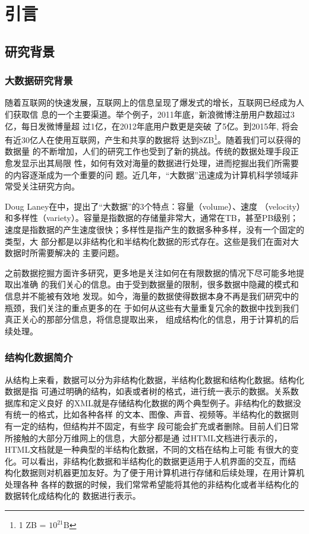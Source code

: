 \chapter{引言}
\label{chap:intro}

\section{研究背景}
\label{sec:background}
\subsection{大数据研究背景}
随着互联网的快速发展，互联网上的信息呈现了爆发式的增长，互联网已经成为人们获取信
息的一个主要渠道。举个例子，2011年底，新浪微博注册用户数超过3亿，每日发微博量超
过1亿\cite{weibo-info1}，在2012年底用户数更是突破
了5亿\cite{weibo-info2}。到2015年, 将会有近30亿人在使用互联网，产生和共享的数据将
达到8ZB\footnote{1 ZB = $10^{21}$B}\cite{bigdata-info}。随着我们可以获得的数据量
的不断增加，人们的研究工作也受到了新的挑战。传统的数据处理手段正愈发显示出其局限
性，如何有效对海量的数据进行处理，进而挖掘出我们所需要的内容逐渐成为一个重要的问
题。近几年，“大数据”迅速成为计算机科学领域非常受关注研究方向。

Doug Laney在\cite{3V}中，提出了“大数据”的3个特点：容量（volume）、速度
（velocity）和多样性（variety）。容量是指数据的存储量非常大，通常在TB，甚至PB级别；
速度是指数据的产生速度很快；多样性是指产生的数据多种多样，没有一个固定的类型，大
部分都是以非结构化和半结构化数据的形式存在。这些是我们在面对大数据时所需要解决的
主要问题。

之前数据挖掘方面许多研究，更多地是关注如何在有限数据的情况下尽可能多地提取出准确
的我们关心的信息。由于受到数据量的限制，很多数据中隐藏的模式和信息并不能被有效地
发现。如今，海量的数据使得数据本身不再是我们研究中的瓶颈，我们关注的重点更多的在
于如何从这些有大量重复冗余的数据中找到我们真正关心的那部分信息，将信息提取出来，
组成结构化的信息，用于计算机的后续处理。
\subsection{结构化数据简介}
\label{sec:structuredata1}
从结构上来看，数据可以分为非结构化数据，半结构化数据和结构化数据。结构化数据是指
可通过明确的结构，如表或者树的格式，进行统一表示的数据。关系数据库和定义良好
的XML就是存储结构化数据的两个典型例子。非结构化的数据没有统一的格式，比如各种各样
的文本、图像、声音、视频等。半结构化的数据则有一定的结构，但结构并不固定，有些字
段可能会扩充或者删除。目前人们日常所接触的大部分万维网上的信息，大部分都是通
过HTML文档进行表示的，HTML文档就是一种典型的半结构化数据，不同的文档在结构上可能
有很大的变化。可以看出，非结构化数据和半结构化的数据更适用于人机界面的交互，而结
构化数据则对机器更加友好。为了便于用计算机进行存储和后续处理，在用计算机处理各种
各样的数据的时候，我们常常希望能将其他的非结构化或者半结构化的数据转化成结构化的
数据进行表示。

